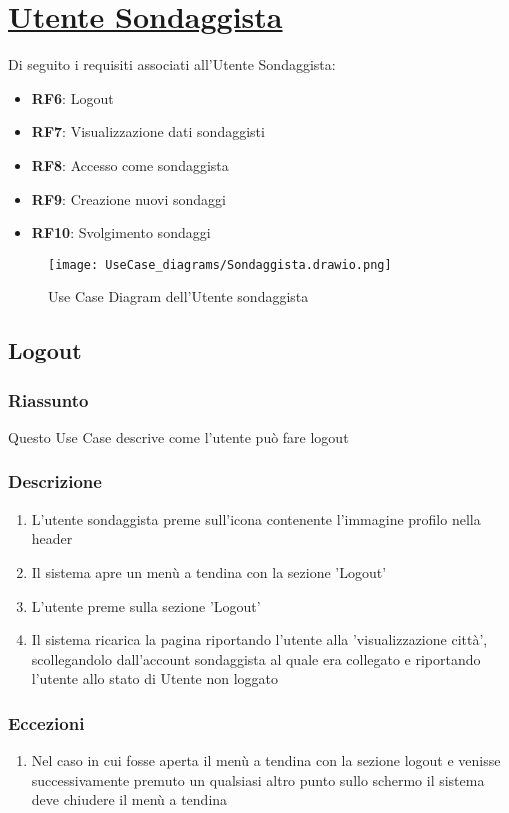 \section{\underline{Utente Sondaggista}}
    Di seguito i requisiti associati all'Utente Sondaggista:
    \begin{itemize}
        \item \textbf{RF6}: Logout
        \item \textbf{RF7}: Visualizzazione dati sondaggisti
        \item \textbf{RF8}: Accesso come sondaggista
        \item \textbf{RF9}: Creazione nuovi sondaggi
        \item \textbf{RF10}: Svolgimento sondaggi
    \end{itemize}
    \begin{figure}[H]
        \centering
        \texttt{[image: UseCase\_diagrams/Sondaggista.drawio.png]}
        \caption{Use Case Diagram dell'Utente sondaggista}
    \end{figure}

    \subsection{Logout}
        \subsubsection{Riassunto}
            Questo Use Case descrive come l'utente può fare logout
        \subsubsection{Descrizione}
            \begin{enumerate}
                \item L'utente sondaggista preme sull'icona contenente l'immagine profilo nella header
                \item Il sistema apre un menù a tendina con la sezione 'Logout'
                \item L'utente preme sulla sezione 'Logout'
                \item Il sistema ricarica la pagina riportando l'utente alla 'visualizzazione città', scollegandolo dall'account sondaggista al quale era collegato e riportando l'utente allo stato di Utente non loggato
            \end{enumerate}
        \subsubsection{Eccezioni}
            \begin{enumerate}
                \item Nel caso in cui fosse aperta il menù a tendina con la sezione logout e venisse successivamente premuto un qualsiasi altro punto sullo schermo il sistema deve chiudere il menù a tendina
            \end{enumerate}

